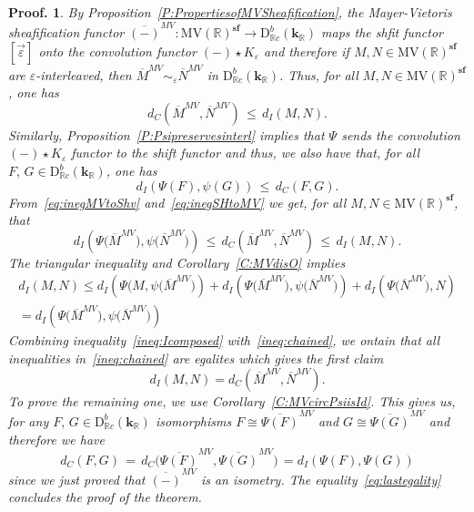 \documentclass[a4paper, english, 11pt]{article}
\newcommand{\kk}[0]{\textbf{k}}
\newcommand{\0}{\vec{0}}
\newcommand{\R}[0]{\mathbb{R}}
\newcommand{\D}[0]{\text{D}}
\newcommand{\s}{\textbf{sf}}
\newtheorem*{pf}{Proof.} }
\begin{document}
\begin{pf}
 By Proposition~\ref{P:PropertiesofMVSheafification}, the Mayer-Vietoris sheafification functor $\overline{(-)}^{MV}:  \mbox{MV}(\R)^\s\to \D^b_{\R c}(\kk_\R)$ maps the shfit functor $[\vec{\varepsilon}]$ onto the convolution functor $(-)\star K_{\varepsilon}$  and therefore if  $M, N \in \mbox{MV}(\R)^\s$ are $\varepsilon$-interleaved, then $\overline{M}^{MV} \sim_{\varepsilon} \overline{N}^{MV}$ in $ \D^b_{\R c}(\kk_\R)$. Thus,  for all $M, N \in \mbox{MV}(\R)^\s$,  one has 
 \begin{equation}
  \label{eq:inegMVtoShv}  d_C (\overline{M}^{MV}, \overline{N}^{MV}) \, \leqslant \, d_I(M, N).
 \end{equation}
Similarly,  Proposition~\ref{P:Psipreservesinterl} implies that $\Psi$ sends the convolution  $(-)\star K_{\varepsilon}$ functor to the shift functor and thus, we also have that, for all $F,\, G\in  \D^b_{\R c}(\kk_\R)$, one has  
\begin{equation}
  \label{eq:inegSHtoMV} d_I(\Psi(F), \psi(G)) \, \leqslant \, d_C (F, G). 
 \end{equation}
 From~\eqref{eq:inegMVtoShv} and~\eqref{eq:inegSHtoMV} we get, for all $M, N \in \mbox{MV}(\R)^\s$, that
 \begin{equation}\label{ineq:chained}
  d_I(\Psi\big(\overline{M}^{MV} \big), \psi\big(\overline{N}^{MV} \big)) \, \leqslant \,
  d_C (\overline{M}^{MV}, \overline{N}^{MV})
  \, \leqslant \, d_I(M, N).
 \end{equation}
The triangular inequality and Corollary~\ref{C:MVdisO} implies
\begin{multline}\label{ineq:Icomposed}
 d_I(M,N) \leqslant  d_I(\Psi\big(M, \psi\big(\overline{M}^{MV} \big))
+ d_I(\Psi\big(\overline{M}^{MV} \big), \psi\big(\overline{N}^{MV} \big)) 
+ d_I(\Psi\big(\overline{N}^{MV} \big), N)\\ 
= d_I(\Psi\big(\overline{M}^{MV} \big), \psi\big(\overline{N}^{MV} \big))
 \end{multline}
Combining inequality~\eqref{ineq:Icomposed} with~\eqref{ineq:chained}, we ontain that all inequalities in~\eqref{ineq:chained} are egalites which gives the first claim 
$$d_I(M, N) = d_C (\overline{M}^{MV}, \overline{N}^{MV}).$$
To prove the remaining one, we use Corollary~\ref{C:MVcircPsiisId}. 
This gives us, for any $F, \, G\in  \D^b_{\R c}(\kk_\R)$ isomorphisms 
$F\cong \overline{\Psi(F)}^{MV}$ and $G\cong \overline{\Psi(G)}^{MV}$ and therefore we have
\begin{equation}\label{eq:lastegality}
 d_C(F,G) \, = \, d_C\big( \overline{\Psi(F)}^{MV}, \overline{\Psi(G)}^{MV}\big) \, =
 d_I(\Psi(F), \Psi(G))
\end{equation}
since we just proved that $\overline{(-)}^{MV}$ is an isometry. The equality~\eqref{eq:lastegality} concludes the proof of the theorem.
\end{pf}
\end{document}
